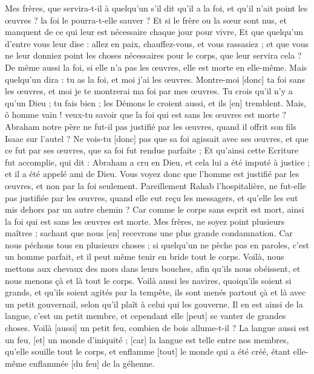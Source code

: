 \begin{multicols}{2}
Mes frères, que servira-t-il à quelqu'un s'il dit qu'il a la foi, et qu'il n'ait point les œuvres ? la foi le pourra-t-elle sauver ?
Et si le frère ou la sœur sont nus, et manquent de ce qui leur est nécessaire chaque jour pour vivre,
Et que quelqu'un d'entre vous leur dise : allez en paix, chauffez-vous, et vous rassasiez ; et que vous ne leur donniez point les choses nécessaires pour le corps, que leur servira cela ?
De même aussi la foi, si elle n'a pas les œuvres, elle est morte en elle-même.
Mais quelqu'un dira : tu as la foi, et moi j'ai les œuvres. Montre-moi [donc] ta foi sans les œuvres, et moi je te montrerai ma foi par mes œuvres.
Tu crois qu'il n'y a qu'un Dieu ; tu fais bien ; les Démons le croient aussi, et ils [en] tremblent.
Mais, ô homme vain ! veux-tu savoir que la foi qui est sans les œuvres est morte ?
Abraham notre père ne fut-il pas justifié par les œuvres, quand il offrit son fils Isaac sur l'autel ?
Ne vois-tu [donc] pas que sa foi agissait avec ses œuvres, et que ce fut par ses œuvres, que sa foi fut rendue parfaite ;
Et qu'ainsi cette Ecriture fut accomplie, qui dit : Abraham a cru en Dieu, et cela lui a été imputé à justice ; et il a été appelé ami de Dieu.
Vous voyez donc que l'homme est justifié par les œuvres, et non par la foi seulement.
Pareillement Rahab l'hospitalière, ne fut-elle pas justifiée par les œuvres, quand elle eut reçu les messagers, et qu'elle les eut mis dehors par un autre chemin ?
Car comme le corps sans esprit est mort, ainsi la foi qui est sans les œuvres est morte.
\VerseOne{}Mes frères, ne soyez point plusieurs maîtres ; sachant que nous [en] recevrons une plus grande condamnation.
Car nous péchons tous en plusieurs choses ; si quelqu'un ne pèche pas en paroles, c’est un homme parfait, et il peut même tenir en bride tout le corps.
Voilà, nous mettons aux chevaux des mors dans leurs bouches, afin qu'ils nous obéissent, et nous menons çà et là tout le corps.
Voilà aussi les navires, quoiqu'ils soient si grands, et qu'ils soient agités par la tempête, ils sont menés partout çà et là avec un petit gouvernail, selon qu'il plaît à celui qui les gouverne.
Il en est ainsi de la langue, c'est un petit membre, et cependant elle [peut] se vanter de grandes choses. Voilà [aussi] un petit feu, combien de bois allume-t-il ?
La langue aussi est un feu, [et] un monde d'iniquité ; [car] la langue est telle entre nos membres, qu'elle souille tout le corps, et enflamme [tout] le monde qui a été créé, étant elle-même enflammée [du feu] de la géhenne.

\end{multicols}
